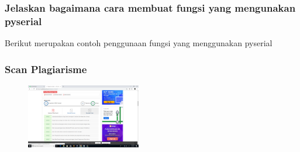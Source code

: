 \subsubsection{Jelaskan bagaimana cara membuat fungsi yang mengunakan pyserial}


Berikut merupakan contoh penggunaan fungsi yang menggunakan pyserial


\subsubsection{Scan Plagiarisme}
\begin{figure}[H] 
\includegraphics[width=5cm]{figures/5/Teori/1174025/noplg.png}
\centering
\end{figure}